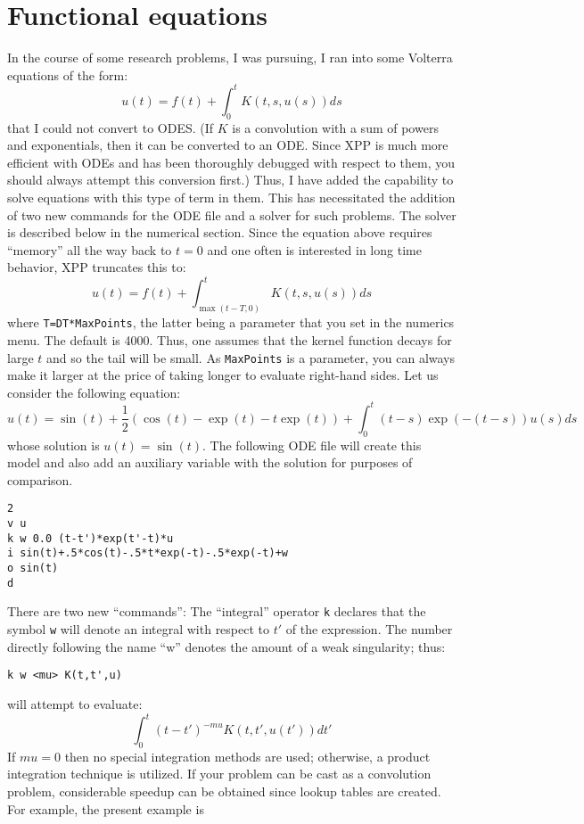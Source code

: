 \section{Functional equations}
In the course of some research problems, I was pursuing, I ran into
some Volterra equations of the form:
\[
	u(t)=f(t)+\int_0^t K(t,s,u(s))ds
\]
that I could not convert to ODES.  (If $K$ is a convolution with a 
sum of powers and
exponentials, then it can be converted to an ODE.  Since XPP is much
more efficient with ODEs and has been thoroughly debugged with respect
to them, you should always attempt this conversion first.)  Thus, I
have added the capability to solve equations with this type of term in
them.  This has necessitated the addition of two new commands for the
ODE file and a solver for such problems. The solver is
described below in the numerical section.  Since the equation above
requires ``memory'' all the way back to $t=0$ and one often is
interested in long time behavior, XPP truncates this to:
\[
	u(t)=f(t)+\int_{\max(t-T,0)}^t K(t,s,u(s))ds
\]
where {\tt T=DT*MaxPoints}, the latter being a parameter that you
set in the numerics menu.  The default is 4000.  Thus, one
assumes that the kernel function decays for large $t$ and so the tail
will be small.  As {\tt MaxPoints} is a parameter, you can always make
it larger at the price of taking longer to evaluate right-hand sides.
Let us consider
the following equation:
\[
 u(t) = \sin(t)+\frac{1}{2}(\cos(t)-\exp(t)-t\exp(t))+\int_0^t
(t-s)\exp(-(t-s))u(s)ds
\]
whose solution is $u(t)=\sin(t).$  The following ODE file will create
this model and also add an auxiliary variable with the solution for
purposes of comparison.
\begin{verbatim}
2
v u
k w 0.0 (t-t')*exp(t'-t)*u
i sin(t)+.5*cos(t)-.5*t*exp(-t)-.5*exp(-t)+w
o sin(t)
d
\end{verbatim}
There are two new ``commands'':
The ``integral'' operator {\tt k}   
declares that the symbol {\tt w} will denote an integral with respect
to $t'$ of the expression. The number directly following the name
``w'' denotes the amount of a weak singularity; thus:
\begin{verbatim}
k w <mu> K(t,t',u)
\end{verbatim}
will attempt to evaluate:
\[
\int_0^t (t-t')^{-mu} K(t,t',u(t')) dt'
\]
If $mu=0$ then no special integration methods are used; otherwise, a
product integration technique is utilized.  If your problem can be
cast as a convolution problem, considerable speedup can be obtained
since lookup tables are created.  For example, the present example is
